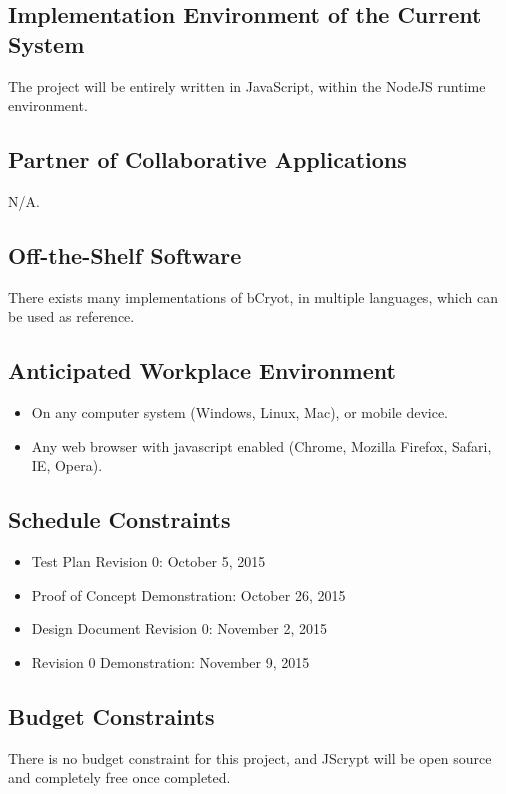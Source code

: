 \documentclass[12pt]{article}
\begin{document}
\subsection{Implementation Environment of the Current System}
	The project will be entirely written in JavaScript, within the NodeJS runtime environment.

\subsection{Partner of Collaborative Applications}
	N/A.

\subsection{Off-the-Shelf Software}
	There exists many implementations of bCryot, in multiple languages, which can be used as reference.


\subsection{Anticipated Workplace Environment}
	\begin{itemize}
	\item On any computer system (Windows, Linux, Mac), or mobile device.
	\item Any web browser with javascript enabled (Chrome, Mozilla Firefox, Safari, IE, Opera).
	\end{itemize}


\subsection{Schedule Constraints}

	\begin{itemize}
	\item Test Plan Revision 0: October 5, 2015
	\item Proof of Concept Demonstration: October 26, 2015
	\item Design Document Revision 0: November 2, 2015
	\item Revision 0 Demonstration: November 9, 2015
	\end{itemize}


\subsection{Budget Constraints}
	There is no budget constraint for this project, and JScrypt will be open source and completely free once completed. 
\end{document}
